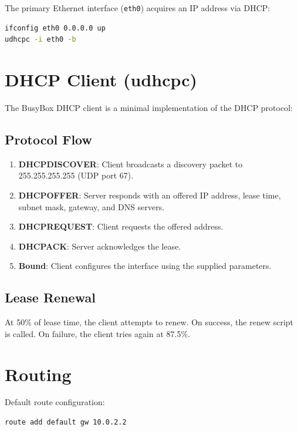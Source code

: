 The primary Ethernet interface (\texttt{eth0}) acquires an IP address
via DHCP:

\begin{lstlisting}[language=bash]
ifconfig eth0 0.0.0.0 up
udhcpc -i eth0 -b
\end{lstlisting}

\section{DHCP Client (udhcpc)}

The BusyBox DHCP client is a minimal implementation of the DHCP protocol:

\subsection{Protocol Flow}

\begin{enumerate}[nosep]
  \item \textbf{DHCPDISCOVER}: Client broadcasts a discovery packet to
        255.255.255.255 (UDP port 67).
  \item \textbf{DHCPOFFER}: Server responds with an offered IP address,
        lease time, subnet mask, gateway, and DNS servers.
  \item \textbf{DHCPREQUEST}: Client requests the offered address.
  \item \textbf{DHCPACK}: Server acknowledges the lease.
  \item \textbf{Bound}: Client configures the interface using the
        supplied parameters.
\end{enumerate}

\subsection{Lease Renewal}

At 50\% of lease time, the client attempts to renew. On success, the
renew script is called. On failure, the client tries again at 87.5\%.

\section{Routing}

Default route configuration:

\begin{lstlisting}[language=bash]
route add default gw 10.0.2.2
\end{lstlisting}


